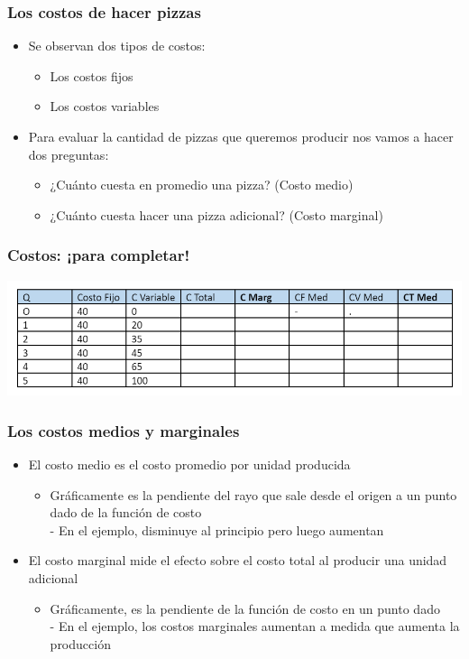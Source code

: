 \documentclass{beamer}
\begin{document}
\begin{frame}
\frametitle{Los costos de hacer pizzas}
\begin{itemize}
    \item Se observan dos tipos de costos: 
        \begin{itemize}
        \item Los costos fijos
        \item Los costos variables
        \end{itemize}
    \vspace{2mm}
    \item Para evaluar la cantidad de pizzas que queremos producir nos vamos a hacer dos preguntas:
        \begin{itemize}
        \item ¿Cuánto cuesta en promedio una pizza? (Costo medio)
        \item ¿Cuánto cuesta hacer una pizza adicional? (Costo marginal)
        \end{itemize}
\end{itemize}
\end{frame}

\begin{frame}
\frametitle{Costos: ¡para completar! }
\centering
\includegraphics[scale=0.6]{Slides Principios de Economia/Figures/Cost1.png}
\end{frame}

\begin{frame}
\frametitle{Los costos medios y marginales}
\begin{itemize}
    \item El costo medio es el costo promedio por unidad producida
    \begin{itemize}
        \item Gráficamente es la pendiente del rayo que sale desde el origen a un punto dado de la función de costo \\
        - En el ejemplo, disminuye al principio pero luego aumentan 
    \end{itemize}
    \item El costo marginal mide el efecto sobre el costo total al producir una unidad adicional
    \begin{itemize}
        \item Gráficamente, es la pendiente de la función de costo en un punto dado \\
        - En el ejemplo, los costos marginales aumentan a medida que aumenta la producción
    \end{itemize}
\end{itemize}
\end{frame}
\end{document}
